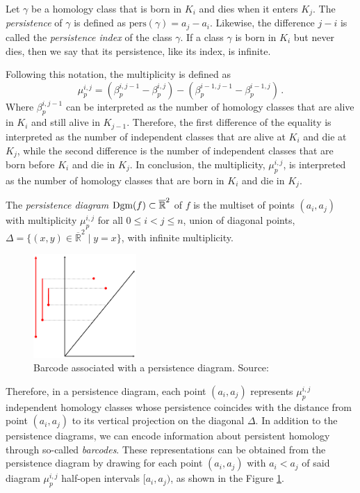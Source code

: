 \documentclass[../main.tex]{subfiles}
\begin{document}
\begin{definition}
Let $\gamma$ be a homology class that is born in $K_i$ and dies when it enters $K_j$. The \emph{persistence} of $\gamma$ is defined as $\text{pers}(\gamma)= a_j - a_i$. Likewise, the difference $j-i$ is called the \emph{persistence index} of the class $\gamma$. If a class $\gamma$ is born in $K_i$ but never dies, then we say that its persistence, like its index, is infinite.
\end{definition}

Following this notation, the multiplicity is defined as
\[
\mu_p^{i,j} = (\beta_p^{i,j-1}-\beta_p^{i,j})-(\beta_p^{i-1, j-1}-\beta_p^{i-1, j})\,.
\]
Where $\beta_p^{i, j-1}$ can be interpreted as the number of homology classes that are alive in $K_i$ and still alive in $K_{j-1}$. Therefore, the first difference of the equality is interpreted as the number of independent classes that are alive at $K_i$ and die at $K_j$, while the second difference is the number of independent classes that are born before $K_i$ and die in $K_j$. In conclusion, the multiplicity, $\mu_p^{i, j}$, is interpreted as the number of homology classes that are born in $K_i$ and die in $K_j$.


\begin{definition}
The \emph{persistence diagram} $\text{Dgm}(f) \subset \overline{\mathbb{R}}^2$ of $f$ is the multiset of points $(a_i, a_j)$ with multiplicity $ \mu_p^{i, j}$ for all $0 \leq i < j \leq n$, union of diagonal points, $\Delta=\{(x, y) \in \overline{\mathbb{R }}^2 \mid y = x\}$, with infinite multiplicity.
\end{definition}

\begin{figure}[!ht]
\centering
\includegraphics[width=0.35\textwidth]{figures/bg/The-Persistence-Diagram-Associated-to-a-Barcode.png} 
\caption{Barcode associated with a persistence diagram. Source: \cite{curry_fiber_2019}}
\label{fig:codigoBarras}
\end{figure}

Therefore, in a persistence diagram, each point $(a_i, a_j)$ represents $\mu_p^{i, j}$ independent homology classes whose persistence coincides with the distance from point $(a_i, a_j)$ to its vertical projection on the diagonal $\Delta $. In addition to the persistence diagrams, we can encode information about persistent homology through so-called \emph{barcodes}. These representations can be obtained from the persistence diagram by drawing for each point $(a_i, a_j)$ with $a_i < a_j$ of said diagram $\mu_p^{i, j}$ half-open intervals $[a_i, a_j) $, as shown in the Figure \ref{fig:codigoBarras}.\\
\end{document}
